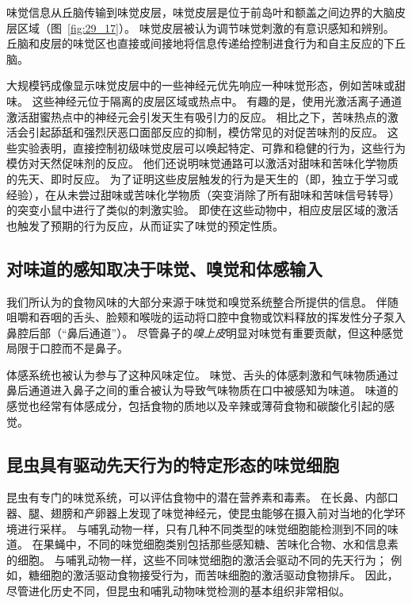 味觉信息从丘脑传输到味觉皮层，味觉皮层是位于前岛叶和额盖之间边界的大脑皮层区域（图~\ref{fig:29_17}）。
味觉皮层被认为调节味觉刺激的有意识感知和辨别。
丘脑和皮层的味觉区也直接或间接地将信息传递给控制进食行为和自主反应的下丘脑。


大规模钙成像显示味觉皮层中的一些神经元优先响应一种味觉形态，例如苦味或甜味。
这些神经元位于隔离的皮层区域或热点中。
有趣的是，使用光激活离子通道激活甜蜜热点中的神经元会引发天生有吸引力的反应。
相比之下，苦味热点的激活会引起舔舐和强烈厌恶口面部反应的抑制，模仿常见的对促苦味剂的反应。
这些实验表明，直接控制初级味觉皮层可以唤起特定、可靠和稳健的行为，这些行为模仿对天然促味剂的反应。
他们还说明味觉通路可以激活对甜味和苦味化学物质的先天、即时反应。
为了证明这些皮层触发的行为是天生的（即，独立于学习或经验），在从未尝过甜味或苦味化学物质（突变消除了所有甜味和苦味信号转导）的突变小鼠中进行了类似的刺激实验。
即使在这些动物中，相应皮层区域的激活也触发了预期的行为反应，从而证实了味觉的预定性质。



\subsection{对味道的感知取决于味觉、嗅觉和体感输入}

我们所认为的食物风味的大部分来源于味觉和嗅觉系统整合所提供的信息。
伴随咀嚼和吞咽的舌头、脸颊和喉咙的运动将口腔中食物或饮料释放的挥发性分子泵入鼻腔后部（“鼻后通道”）。 
尽管鼻子的\textit{嗅上皮}明显对味觉有重要贡献，但这种感觉局限于口腔而不是鼻子。


体感系统也被认为参与了这种风味定位。
味觉、舌头的体感刺激和气味物质通过鼻后通道进入鼻子之间的重合被认为导致气味物质在口中被感知为味道。
味道的感觉也经常有体感成分，包括食物的质地以及辛辣或薄荷食物和碳酸化引起的感觉。



\subsection{昆虫具有驱动先天行为的特定形态的味觉细胞}

昆虫有专门的味觉系统，可以评估食物中的潜在营养素和毒素。
在长鼻、内部口器、腿、翅膀和产卵器上发现了味觉神经元，使昆虫能够在摄入前对当地的化学环境进行采样。
与哺乳动物一样，只有几种不同类型的味觉细胞能检测到不同的味道。
在果蝇中，不同的味觉细胞类别包括那些感知糖、苦味化合物、水和信息素的细胞。
与哺乳动物一样，这些不同味觉细胞的激活会驱动不同的先天行为；
例如，糖细胞的激活驱动食物接受行为，而苦味细胞的激活驱动食物排斥。
因此，尽管进化历史不同，但昆虫和哺乳动物味觉检测的基本组织非常相似。


